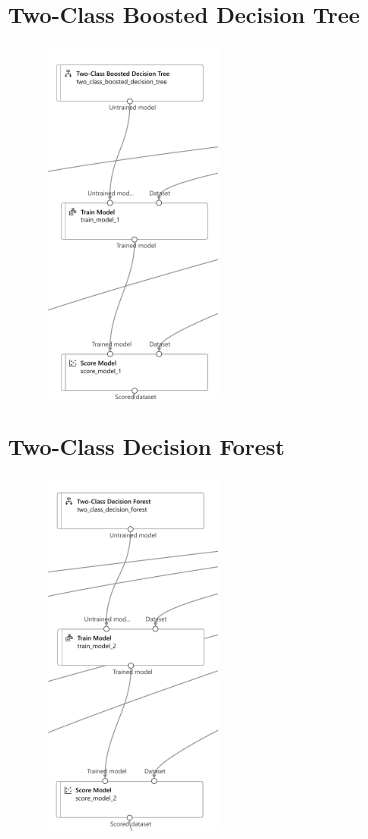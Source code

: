 \subsection{Two-Class Boosted Decision Tree}


\begin{figure}[H]
    \centering
    \includegraphics[width=0.4\textwidth]{images/dt_pipe}
    \label{fig:dt-pipe}
\end{figure}

\subsection{Two-Class Decision Forest}
\begin{figure}[H]
    \centering
    \includegraphics[width=0.4\textwidth]{images/df_pipe}
    \label{fig:df-pipe}
\end{figure}

